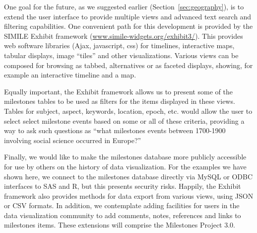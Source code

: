 \documentclass[11pt]{article}
\newcommand*{\secref}[1]{Section~\ref{#1}}
\begin{document}
One goal for the future, as we suggested earlier (\secref{sec:geography}), is to extend the user interface to provide multiple
views and advanced text search and filtering capabilities.
One convenient path for this development is provided by the SIMILE Exhibit framework
(\url{www.simile-widgets.org/exhibit3/}).
This provides web software libraries (Ajax, javascript, css) for
timelines, interactive maps, tabular displays, image ``tiles'' and other visualizations.
Various views can be composed for browsing as tabbed, alternatives or as faceted displays, showing, for example an interactive timeline and
a map.

Equally important, the Exhibit framework allows us to present some of the milestones tables to be used as filters for the items
displayed in these views.
Tables for subject, aspect, keywords, location, epoch, etc. would allow the user to select
select milestone events based on some or all of these criteria, providing a way to ask such questions as
``what milestones events between 1700-1900 involving social science occurred in Europe?'' 

Finally, we would like to make the milestones database more publicly accessible for use by others on the history of data
visualization.
For the examples we have shown here, we connect to the milestones database directly via MySQL or ODBC
interfaces to SAS and R, but this presents security risks.
Happily, the Exhibit framework also provides methods for
data export from various views, using JSON or CSV formats.
In addition, we contemplate adding facilities for users in
the data visualization community to add comments, notes, references and links to milestones items.
These extensions will comprise the Milestones Project 3.0.

%
        
\end{document}
